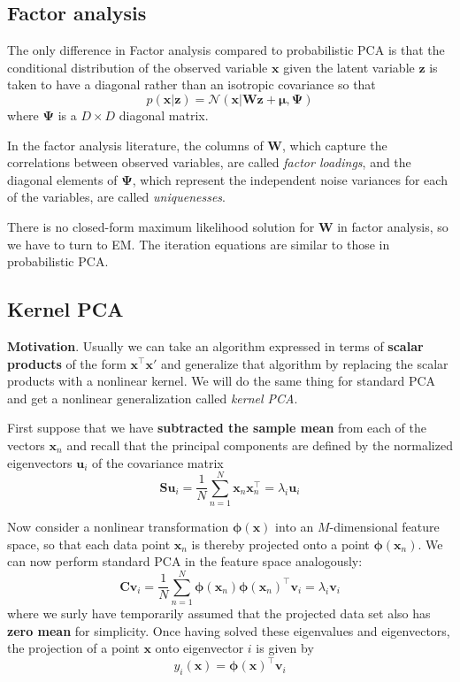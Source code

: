 \documentclass[a4paper]{book}
\renewcommand{\bf}{\mathbf}
\renewcommand{\cal}{\mathcal}
\newcommand{\imp}[1]{\textit{#1}}
\newcommand{\bs}{\boldsymbol}
\begin{document}
\subsection{Factor analysis}
The only difference in Factor analysis compared to probabilistic PCA is that the conditional distribution of the observed variable $\bf{x}$ given the latent variable $\bf{z}$ is taken to have a diagonal rather than an isotropic covariance so that
\begin{equation}
	p(\bf{x|z}) = \cal{N} (\bf{x}|\bf{Wz}+\bs{\mu},\bs{\Psi})
\end{equation}
where $\bs{\Psi}$ is a $D \times D$ diagonal matrix. 

In the factor analysis literature, the columns of $\bf{W}$, which capture the correlations between observed variables, are called \imp{factor loadings}, and the diagonal elements of $\bs{\Psi}$, which represent the independent noise variances for each of the variables, are called \imp{uniquenesses}.

There is no closed-form maximum likelihood solution for $\bf{W}$ in factor analysis, so we have to turn to EM. The iteration equations are similar to those in probabilistic PCA.
\subsection{Kernel PCA}
\textbf{Motivation}. Usually we can take an algorithm expressed in terms of \textbf{scalar products} of the form $\bf{x}^{\intercal} \bf{x'}$ and generalize that algorithm by replacing the scalar products with a nonlinear kernel. We will do the same thing for standard PCA and get a nonlinear generalization called \imp{kernel PCA}.

First suppose that we have \textbf{subtracted the sample mean} from each of the vectors $\bf{x}_n$ and recall that the principal components are defined by the normalized eigenvectors $\bf{u}_i$ of the covariance matrix
\begin{equation}
	\bf{Su}_i = \frac{1}{N} \sum_{n=1}^N \bf{x}_n\bf{x}_n^{\intercal} = \lambda_i \bf{u}_i
\end{equation}

Now consider a nonlinear transformation $\bs{\phi}(\bf{x})$ into an $M$-dimensional feature space, so that each data point $\bf{x}_n$ is thereby projected onto a point $\bs{\phi}(\bf{x}_n)$. We can now perform standard PCA in the feature space analogously:
\begin{equation}
	\bf{Cv}_i = \frac{1}{N}\sum_{n=1}^N \bs{\phi}(\bf{x}_n)\bs{\phi}(\bf{x}_n)^{\intercal} \bf{v}_i = \lambda_i \bf{v}_i \label{KPCA1}
\end{equation}
where we surly have temporarily assumed that the projected data set also has \textbf{zero mean} for simplicity. Once having solved these eigenvalues and eigenvectors, the projection of a point $\bf{x}$ onto eigenvector $i$ is given by
\begin{equation}
	y_i(\bf{x}) = \bs{\phi}(\bf{x})^{\intercal} \bf{v}_i
\end{equation}
\end{document}
